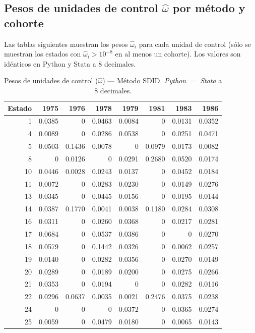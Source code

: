 \subsection*{Pesos de unidades de control $\hat{\omega}$ por m\'etodo y cohorte}

Las tablas siguientes muestran los pesos $\hat{\omega}_i$ para cada unidad de control
(s\'olo se muestran los estados con $\hat{\omega}_i > 10^{-8}$ en al menos un cohorte).
Los valores son id\'enticos en Python y Stata a 8 decimales.



\begin{table}[H]
\centering
\caption{Pesos de unidades de control ($\hat{\omega}$) --- M\'etodo SDID. \textit{Python} $=$ \textit{Stata} a 8 decimales.}
\label{tab:omega_sdid}
\small
\begin{tabular}{rrrrrrrr}
\toprule
Estado & 1975 & 1976 & 1978 & 1979 & 1981 & 1983 & 1986 \\
\midrule
1 & 0.0385 & 0 & 0.0463 & 0.0084 & 0 & 0.0131 & 0.0352 \\
4 & 0.0089 & 0 & 0.0286 & 0.0538 & 0 & 0.0251 & 0.0471 \\
5 & 0.0503 & 0.1436 & 0.0078 & 0 & 0.0979 & 0.0173 & 0.0082 \\
8 & 0 & 0.0126 & 0 & 0.0291 & 0.2680 & 0.0520 & 0.0174 \\
10 & 0.0446 & 0.0028 & 0.0243 & 0.0137 & 0 & 0.0452 & 0.0184 \\
11 & 0.0072 & 0 & 0.0283 & 0.0230 & 0 & 0.0149 & 0.0276 \\
13 & 0.0345 & 0 & 0.0445 & 0.0156 & 0 & 0.0195 & 0.0144 \\
14 & 0.0387 & 0.1770 & 0.0041 & 0.0038 & 0.1180 & 0.0284 & 0.0308 \\
16 & 0.0311 & 0 & 0.0260 & 0.0368 & 0 & 0.0217 & 0.0281 \\
17 & 0.0684 & 0 & 0.0537 & 0.0386 & 0 & 0 & 0.0270 \\
18 & 0.0579 & 0 & 0.1442 & 0.0326 & 0 & 0.0062 & 0.0257 \\
19 & 0.0140 & 0 & 0.0282 & 0.0356 & 0 & 0.0270 & 0.0149 \\
20 & 0.0289 & 0 & 0.0189 & 0.0200 & 0 & 0.0275 & 0.0266 \\
21 & 0.0353 & 0 & 0.0194 & 0 & 0 & 0.0282 & 0.0116 \\
22 & 0.0296 & 0.0637 & 0.0035 & 0.0021 & 0.2476 & 0.0375 & 0.0238 \\
24 & 0 & 0 & 0 & 0.0372 & 0 & 0.0365 & 0.0274 \\
25 & 0.0059 & 0 & 0.0479 & 0.0180 & 0 & 0.0065 & 0.0143 \\

\end{tabular}
\end{table}
